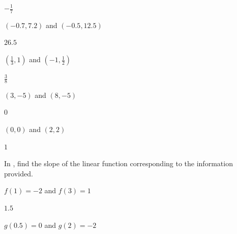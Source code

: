 \begin{solution}
    $-\frac{1}{7}$
\end{solution}



\begin{exercise}
$(-0.7,7.2)$ and $(-0.5,12.5)$
\end{exercise}

\begin{solution}
    $26.5$
\end{solution}



\begin{exercise}
$\left(\frac{1}{3},1\right)$ and $\left(-1,\frac{1}{2}\right)$
\end{exercise}

\begin{solution}
    $\frac{3}{8}$
\end{solution}



\begin{exercise}
$(3,-5)$ and $(8,-5)$
\end{exercise}

\begin{solution}
    $0$
\end{solution}



\begin{exercise}\label{exercise-2.1.10}
$(0,0)$ and $(2,2)$
\end{exercise}

\begin{solution}
    $1$
\end{solution}












In , find the slope of the linear function corresponding to the information provided.

\begin{exercise}\label{exercise-2.1.11}
$f(1)=-2$ and $f(3)=1$
\end{exercise}

\begin{solution}
    $1.5$
\end{solution}

\begin{exercise}
$g(0.5)=0$ and $g(2)=-2$
\end{exercise}

